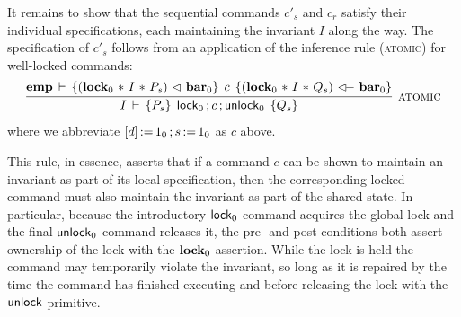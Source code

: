 \documentclass[11pt]{report}         %
\begin{document}
It remains to show that the sequential commands $c'_s$ and $c_r$ satisfy their individual specifications, each maintaining the invariant $I$ along the way. The specification of $c'_s$ follows from an application of the inference rule (\textsc{atomic}) for well-locked commands: \[ \infer[\textsc{atomic}]{\spec{I}{P_s}{\clock_0 \opseq c \opseq \cunlock_0}{Q_s} }{\spec{\femp}{(\flock{0} \fsep I \fsep P_s) \fseq \fbar{0}}{c}{(\flock{0} \fsep I \fsep Q_s) \fseqri \fbar{0}}}\] where we abbreviate $\left[ d \right] \operatorname{:\!=} 1_0 \operatorname{;} s \operatorname{:\!=} 1_0$ as $c$ above. 

This rule, in essence, asserts that if a command $c$ can be shown to maintain an invariant as part of its local specification, then the corresponding locked command must also maintain the invariant as part of the shared state. In particular, because the introductory $\operatorname{\mathsf{lock}}_0$ command acquires the global lock and the final $\operatorname{\mathsf{unlock}}_0$ command releases it, the pre- and post-conditions both assert ownership of the lock with the $\mathbf{lock}_{0}$ assertion. While the lock is held the command may temporarily violate the invariant, so long as it is repaired by the time the command has finished executing and before releasing the lock with the $\operatorname{\mathsf{unlock}}$ primitive. 
\end{document}
